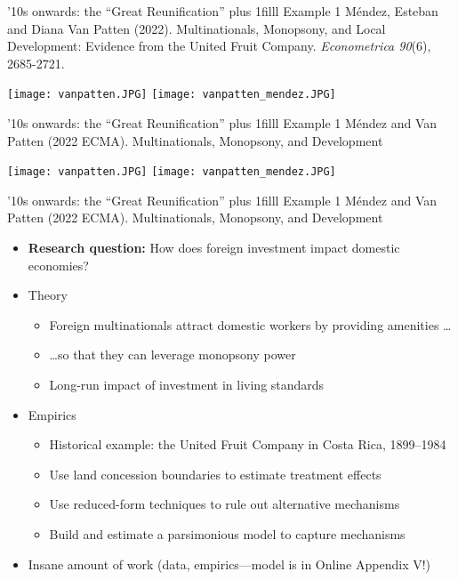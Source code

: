\documentclass[aspectratio=169,compress,t,xcolor=table]{beamer}
\newcommand{\myhfill}[1]{\hskip0pt plus 1filll {\small #1}}
\begin{document}
\begin{frame}{'10s onwards: the ``Great Reunification'' \myhfill{Example 1}}
Méndez, Esteban and Diana Van Patten (2022). Multinationals, Monopsony, and Local Development: Evidence from the United Fruit Company. \textit{Econometrica 90}(6), 2685-2721.
  \begin{center}
    \texttt{[image: vanpatten.JPG]} \hspace*{1em}
    \texttt{[image: vanpatten\_mendez.JPG]}
  \end{center}
\end{frame}
\addtocounter{framenumber}{-1}

\begin{frame}{'10s onwards: the ``Great Reunification'' \myhfill{Example 1}}
Méndez and Van Patten (2022 ECMA). Multinationals, Monopsony, and Development \\ \phantom{you}
  \begin{center}
    \texttt{[image: vanpatten.JPG]} \hspace*{1em}
    \texttt{[image: vanpatten\_mendez.JPG]}
  \end{center}
\end{frame}
\addtocounter{framenumber}{-1}

\begin{frame}{'10s onwards: the ``Great Reunification'' \myhfill{Example 1}}
Méndez and Van Patten (2022 ECMA). Multinationals, Monopsony, and Development 
  \begin{itemize}
    \vfill\item {\color{MyStructure}\textbf{Research question:}} How does foreign investment impact domestic economies?
    \vfill\item Theory
    \begin{itemize}
      \item Foreign multinationals attract domestic workers by providing amenities \ldots
      \item \ldots so that they can leverage monopsony power
      \item Long-run impact of investment in living standards
    \end{itemize}
    \vfill\item Empirics
    \begin{itemize}
      \item Historical example: the United Fruit Company in Costa Rica, 1899--1984
      \item Use land concession boundaries to estimate treatment effects
      \item Use reduced-form techniques to rule out alternative mechanisms
      \item Build and estimate a parsimonious model to capture mechanisms
    \end{itemize}

    \vfill\item Insane amount of work (data, empirics---model is in Online Appendix V!)
  \end{itemize}
\end{frame}
\end{document}
